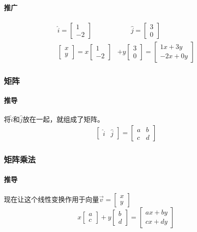\documentclass[UTF8]{ctexart}
\begin{document}
\paragraph{推广}
\begin{align*}
	\hat{i} = \begin{bmatrix}
		1 \\ -2
	\end{bmatrix} &\qquad
	\hat{j} = \begin{bmatrix}
		3 \\ 0
	\end{bmatrix} \\
	\begin{bmatrix}
		x \\ y
	\end{bmatrix} = x \begin{bmatrix}
		1 \\ -2
	\end{bmatrix} &+ y \begin{bmatrix}
		3 \\ 0
	\end{bmatrix} = \begin{bmatrix}
		1x+3y \\ -2x+0y
	\end{bmatrix}
\end{align*}

\subsubsection{矩阵}
\paragraph{推导}
将$\hat{i}$和$\hat{j}$放在一起，就组成了矩阵。
\begin{align*}
	\begin{bmatrix}
		\hat{i} & \hat{j}
	\end{bmatrix} = 
	\begin{bmatrix}
		a&b \\ c&d
	\end{bmatrix}
\end{align*}
\subsubsection{矩阵乘法}
\paragraph{推导}
现在让这个线性变换作用于向量$\overrightarrow{v} = \begin{bmatrix}
	x \\ y
\end{bmatrix}$
$$x \begin{bmatrix}
	a \\ c
\end{bmatrix} + y \begin{bmatrix}
	b \\ d
\end{bmatrix} = \begin{bmatrix}
	ax+by \\ cx+dy
\end{bmatrix}$$
\end{document}
